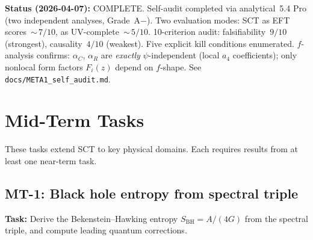 \documentclass[12pt,a4paper]{article}
\newcommand{\task}[1]{\noindent\textbf{Task:} #1\par}
\begin{document}
\textbf{Status (2026-04-07):} \textcolor{proven}{COMPLETE.}
Self-audit completed via analytical~5.4 Pro (two independent analyses, Grade~A$-$).
Two evaluation modes: SCT as EFT scores~${\sim}\,7/10$, as UV-complete~${\sim}\,5/10$.
10-criterion audit: falsifiability~$9/10$ (strongest), causality~$4/10$ (weakest).
Five explicit kill conditions enumerated.
$f$-analysis confirms: $\alpha_C$, $\alpha_R$ are \emph{exactly} $\psi$-independent
(local $a_4$ coefficients); only nonlocal form factors $F_i(z)$ depend on $f$-shape.
See \texttt{docs/META1\_self\_audit.md}.

\section{\textcolor{mid}{Mid-Term Tasks}}
\label{sec:mid}

These tasks extend SCT to key physical domains. Each requires results from
at least one near-term task.

\subsection{MT-1: Black hole entropy from spectral triple}
\label{task:MT1}

\task{Derive the Bekenstein--Hawking entropy $S_{\text{BH}} = A/(4G)$ from
the spectral triple, and compute leading quantum corrections.}
\end{document}
